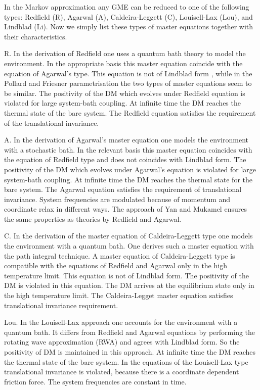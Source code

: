 \documentclass[12pt,twoside,a4paper]{report}
\begin{document}
In the Markov approximation any 
GME
can be reduced to 
one of the following types:
Redfield (R), Agarwal (A), Caldeira-Leggett (C), Louisell-Lax (Lou), 
and Lindblad (Li).
Now we simply list 
these types of master equations 
together with their characteristics.



R. In the derivation of Redfield \cite{redf55}
   one uses a quantum bath theory to model the environment.
   In the appropriate basis this master equation coincide with
   the equation of Agarwal's type.
   This equation is not of Lindblad form \cite{lind76A}, 
   while in the Pollard and Friesner parametrisation \cite{poll94}
   the two types of master equations seem to be similar.
   The positivity of the DM which evolves under 
   Redfield equation is violated for  large system-bath coupling.
   At infinite time the DM reaches
   the thermal state of the bare system.
   The Redfield equation satisfies the requirement of the 
   translational invariance.

A. In the derivation of  Agarwal's master equation \cite{agar71}
   one models the environment with a stochastic bath.
   In the relevant basis this master equation coincides with
   the equation of Redfield type and does not coincides with Lindblad form.
   The positivity of the DM which evolves under 
   Agarwal's equation is violated for large system-bath coupling.
   At infinite time the DM reaches
   the thermal state for the bare system.
   The Agarwal equation satisfies the requirement of  
   translational invariance.
   System frequencies are modulated because of
   momentum and coordinate relax in different ways.
   The approach of Yan and Mukamel \cite{muka88}
   ensures the same properties as theories by Redfield and Agarwal.

C. In the derivation of the master equation of Caldeira-Leggett type \cite{cald83}
   one models the environment with a quantum bath.
   One derives such a master equation with 
   the path integral technique.
   A master equation of Caldeira-Leggett type is compatible with
   the equations of Redfield and Agarwal only 
   in the high temperature limit.
   This equation is not of  Lindblad form.
   The positivity of the DM is violated in this equation.
   The DM arrives at 
   the equilibrium state only in 
   the high temperature limit.
   The Caldeira-Legget master
   equation satisfies translational
   invariance requirement.

Lou. In the Louisell-Lax \cite{loui73} approach one accounts for 
    the environment with 
    a quantum bath.
    It differs from Redfield and Agarwal equations by performing 
    the rotating wave approximation (RWA) and agrees with Lindblad form.
    So the positivity of DM is maintained in this approach.
    At infinite time the DM reaches
    the thermal state of the bare system.
    In the equations of the Louisell-Lax type translational invariance 
    is violated, because there is a coordinate dependent friction force.
    The system frequencies are constant in time.
\end{document}
